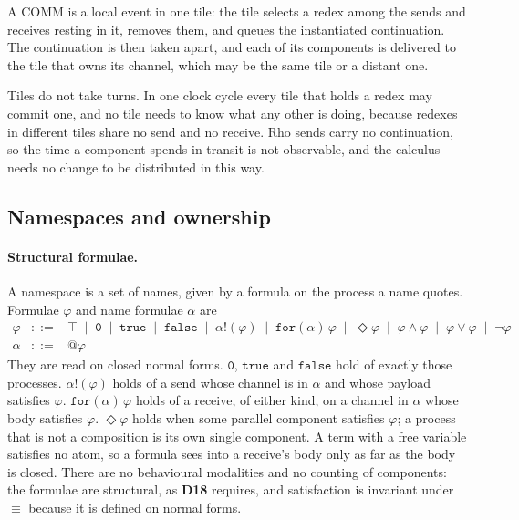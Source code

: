 \documentclass[10.5pt,a4paper]{extarticle}
\makeatletter
\newcommand{\kw}[1]{\texttt{#1}}
\newcommand{\nil}{\kw{0}}
\newcommand{\tru}{\kw{true}}
\newcommand{\fls}{\kw{false}}
\newcommand{\quo}[1]{@#1}
\newcommand{\snd}[2]{#1!(#2)}
\newcommand{\scong}{\equiv}
\newcommand{\dec}[1]{\textbf{D#1}}
\theoremstyle{definition}
\theoremstyle{remark}
\makeatother
\begin{document}
A COMM is a local event in one tile: the tile selects a redex among the sends
and receives resting in it, removes them, and queues the instantiated
continuation. The continuation is then taken apart, and each of its
components is delivered to the tile that owns its channel, which may be the
same tile or a distant one.

Tiles do not take turns. In one clock cycle every tile that holds a redex may
commit one, and no tile needs to know what any other is doing, because
redexes in different tiles share no send and no receive. Rho sends carry no
continuation, so the time a component spends in transit is not observable,
and the calculus needs no change to be distributed in this way.

\subsection{Namespaces and ownership}\label{sec:namespaces}

\paragraph{Structural formulae.} A namespace is a set of names, given by a
formula on the process a name quotes. Formulae $\varphi$ and name formulae
$\alpha$ are
\[
\begin{array}{rcl}
\varphi &::=& \top \;\mid\; \nil \;\mid\; \tru \;\mid\; \fls \;\mid\;
  \snd{\alpha}{\varphi} \;\mid\; \kw{for}(\alpha)\,\varphi \;\mid\;
  \Diamond\varphi \;\mid\; \varphi \wedge \varphi \;\mid\; \varphi \vee \varphi
  \;\mid\; \neg\varphi\\[2pt]
\alpha &::=& \quo{\varphi}
\end{array}
\]
They are read on closed normal forms. $\nil$, $\tru$ and $\fls$ hold of
exactly those processes. $\snd{\alpha}{\varphi}$ holds of a send whose channel
is in $\alpha$ and whose payload satisfies $\varphi$.
$\kw{for}(\alpha)\,\varphi$ holds of a receive, of either kind, on a channel
in $\alpha$ whose body satisfies $\varphi$. $\Diamond\varphi$ holds when some
parallel component satisfies $\varphi$; a process that is not a composition
is its own single component. A term with a free variable satisfies no atom,
so a formula sees into a receive's body only as far as the body is closed.
There are no behavioural modalities and no counting of components: the
formulae are structural, as \dec{18} requires, and satisfaction is invariant
under $\scong$ because it is defined on normal forms.
\end{document}
